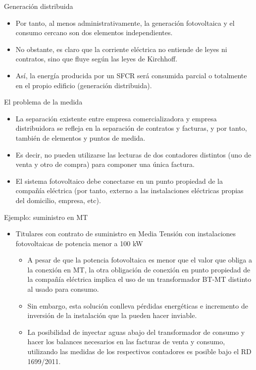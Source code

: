 \documentclass[xcolor={usenames,svgnames,dvipsnames}]{beamer}
\begin{document}
\begin{frame}[label=sec-1-4-3]{Generación distribuida}
\begin{itemize}
\item Por tanto, al menos administrativamente, la generación fotovoltaica y el consumo cercano son dos elementos independientes.

\item No obstante, es claro que la corriente eléctrica no entiende de leyes ni contratos, sino que fluye según las leyes de Kirchhoff.

\item Así, la energía producida por un SFCR será consumida parcial o totalmente en el propio edificio (generación distribuida).
\end{itemize}
\end{frame}

\begin{frame}[label=sec-1-4-4]{El problema de la medida}
\begin{itemize}
\item La separación existente entre empresa comercializadora y empresa distribuidora se refleja en la separación de contratos y facturas, y por tanto, también de elementos y puntos de medida.

\item Es decir, no pueden utilizarse las lecturas de dos contadores distintos (uno de venta y otro de compra) para componer una única factura.

\item El sistema fotovoltaico debe conectarse en un punto propiedad de la compañía eléctrica (por tanto, externo a las instalaciones eléctricas propias del domicilio, empresa, etc).
\end{itemize}
\end{frame}

\begin{frame}[label=sec-1-4-5]{Ejemplo: suministro en MT}
\begin{itemize}
\item \alert{Titulares con contrato de suministro en Media Tensión con instalaciones fotovoltaicas de potencia menor a 100 kW}

\begin{itemize}
\item A pesar de que la potencia fotovoltaica es menor que el valor que obliga a la conexión en MT, la otra obligación de conexión en punto propiedad de la compañía eléctrica implica el uso de un transformador BT-MT distinto al usado para consumo.

\item Sin embargo, esta solución conlleva pérdidas energéticas e incremento de inversión de la instalación que la pueden hacer inviable.

\item La posibilidad de inyectar aguas abajo del transformador de consumo y hacer los balances necesarios en las facturas de venta y consumo, utilizando las medidas de los respectivos contadores es posible bajo el RD 1699/2011.
\end{itemize}
\end{itemize}
\end{frame}
\end{document}
